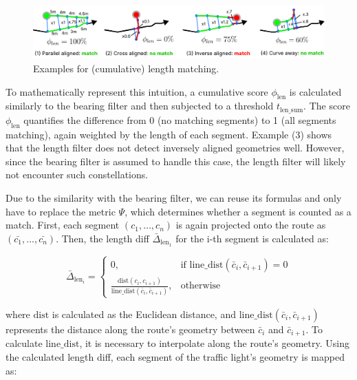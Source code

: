 \begin{figure}[t]
\centering
\includegraphics[width=\linewidth]{images/sg-selection-length-filter-sum.pdf}
\caption{Examples for (cumulative) length matching.}
\label{fig:sg-selection-length-filter-sum}
\end{figure}

To mathematically represent this intuition, a cumulative score $\phi_{\text{len}}$ is calculated similarly to the bearing filter and then subjected to a threshold $t_{\text{len\_sum}}$. The score $\phi_{\text{len}}$ quantifies the difference from 0 (no matching segments) to 1 (all segments matching), again weighted by the length of each segment. Example (3) shows that the length filter does not detect inversely aligned geometries well. However, since the bearing filter is assumed to handle this case, the length filter will likely not encounter such constellations.

Due to the similarity with the bearing filter, we can reuse its formulas and only have to replace the metric $\Psi$, which determines whether a segment is counted as a match. First, each segment $(c_1, \dots, c_n)$ is again projected onto the route as $(\bar{c_1}, \dots, \bar{c_n})$. Then, the length diff $\bar{\Delta}_{\text{len}_1}$ for the i-th segment is calculated as:

\begin{equation}
    \bar{\Delta}_{\text{len}_i} = 
        \begin{cases}
            0,& \text{if } \text{line\_dist}(\bar{c}_i, \bar{c}_{i+1}) = 0 \\
            \frac{\text{dist}(c_{i}, c_{i+1})}{\text{line\_dist}(\bar{c}_{i}, \bar{c}_{i+1})},              & \text{otherwise}
        \end{cases}
\end{equation}

where $\text{dist}$ is calculated as the Euclidean distance, and $\text{line\_dist}(\bar{c}_i, \bar{c}_{i+1})$ represents the distance along the route's geometry between $\bar{c}_i$ and $\bar{c}_{i+1}$. To calculate $\text{line\_dist}$, it is necessary to interpolate along the route's geometry. Using the calculated length diff, each segment of the traffic light's geometry is mapped as:

